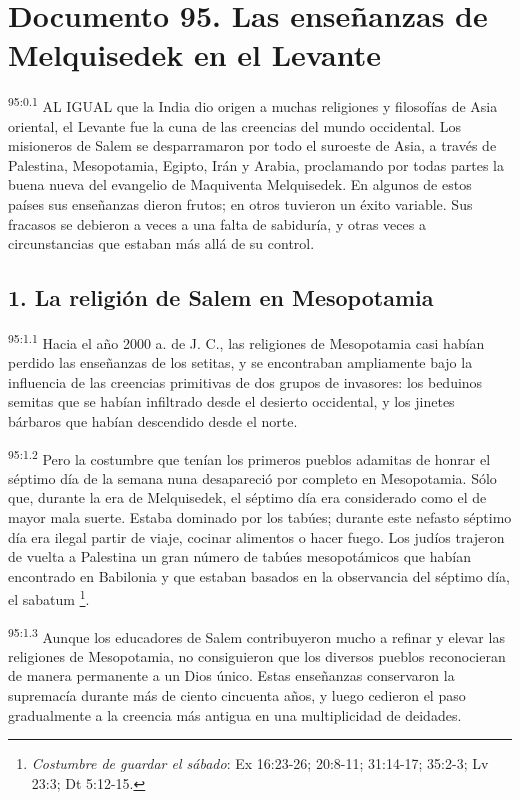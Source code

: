 \chapter{Documento 95. Las enseñanzas de Melquisedek en el Levante}
\par
\textsuperscript{95:0.1} AL IGUAL que la India dio origen a muchas religiones y filosofías de Asia oriental, el Levante fue la cuna de las creencias del mundo occidental. Los misioneros de Salem se desparramaron por todo el suroeste de Asia, a través de Palestina, Mesopotamia, Egipto, Irán y Arabia, proclamando por todas partes la buena nueva del evangelio de Maquiventa Melquisedek. En algunos de estos países sus enseñanzas dieron frutos; en otros tuvieron un éxito variable. Sus fracasos se debieron a veces a una falta de sabiduría, y otras veces a circunstancias que estaban más allá de su control.

\section*{1. La religión de Salem en Mesopotamia}
\par
\textsuperscript{95:1.1} Hacia el año 2000 a. de J. C., las religiones de Mesopotamia casi habían perdido las enseñanzas de los setitas, y se encontraban ampliamente bajo la influencia de las creencias primitivas de dos grupos de invasores: los beduinos semitas que se habían infiltrado desde el desierto occidental, y los jinetes bárbaros que habían descendido desde el norte.

\par
\textsuperscript{95:1.2} Pero la costumbre que tenían los primeros pueblos adamitas de honrar el séptimo día de la semana nuna desapareció por completo en Mesopotamia. Sólo que, durante la era de Melquisedek, el séptimo día era considerado como el de mayor mala suerte. Estaba dominado por los tabúes; durante este nefasto séptimo día era ilegal partir de viaje, cocinar alimentos o hacer fuego. Los judíos trajeron de vuelta a Palestina un gran número de tabúes mesopotámicos que habían encontrado en Babilonia y que estaban basados en la observancia del séptimo día, el sabatum \footnote{\textit{Costumbre de guardar el sábado}: Ex 16:23-26; 20:8-11; 31:14-17; 35:2-3; Lv 23:3; Dt 5:12-15.}.

\par
\textsuperscript{95:1.3} Aunque los educadores de Salem contribuyeron mucho a refinar y elevar las religiones de Mesopotamia, no consiguieron que los diversos pueblos reconocieran de manera permanente a un Dios único. Estas enseñanzas conservaron la supremacía durante más de ciento cincuenta años, y luego cedieron el paso gradualmente a la creencia más antigua en una multiplicidad de deidades.

